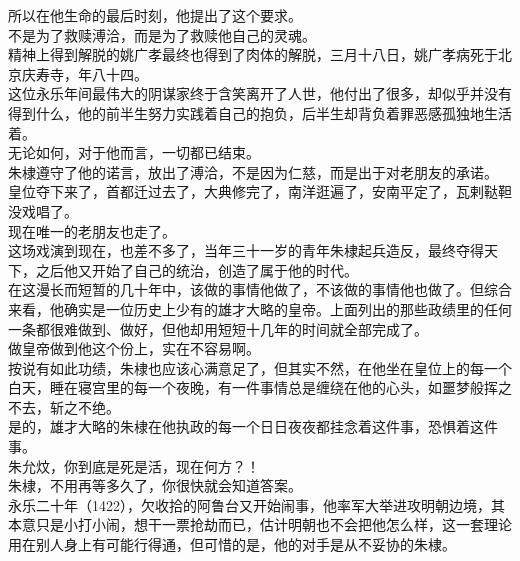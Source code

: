 \begin{multicols}{\theparacolNo}
所以在他生命的最后时刻，他提出了这个要求。\\

不是为了救赎溥洽，而是为了救赎他自己的灵魂。\\

精神上得到解脱的姚广孝最终也得到了肉体的解脱，三月十八日，姚广孝病死于北京庆寿寺，年八十四。\\

这位永乐年间最伟大的阴谋家终于含笑离开了人世，他付出了很多，却似乎并没有得到什么，他的前半生努力实践着自己的抱负，后半生却背负着罪恶感孤独地生活着。\\

无论如何，对于他而言，一切都已结束。\\

朱棣遵守了他的诺言，放出了溥洽，不是因为仁慈，而是出于对老朋友的承诺。\\

皇位夺下来了，首都迁过去了，大典修完了，南洋逛遍了，安南平定了，瓦剌鞑靼没戏唱了。\\

现在唯一的老朋友也走了。\\

这场戏演到现在，也差不多了，当年三十一岁的青年朱棣起兵造反，最终夺得天下，之后他又开始了自己的统治，创造了属于他的时代。\\

在这漫长而短暂的几十年中，该做的事情他做了，不该做的事情他也做了。但综合来看，他确实是一位历史上少有的雄才大略的皇帝。上面列出的那些政绩里的任何一条都很难做到、做好，但他却用短短十几年的时间就全部完成了。\\

做皇帝做到他这个份上，实在不容易啊。\\

按说有如此功绩，朱棣也应该心满意足了，但其实不然，在他坐在皇位上的每一个白天，睡在寝宫里的每一个夜晚，有一件事情总是缠绕在他的心头，如噩梦般挥之不去，斩之不绝。\\

是的，雄才大略的朱棣在他执政的每一个日日夜夜都挂念着这件事，恐惧着这件事。\\

朱允炆，你到底是死是活，现在何方？！\\

朱棣，不用再等多久了，你很快就会知道答案。\\

永乐二十年（1422），欠收拾的阿鲁台又开始闹事，他率军大举进攻明朝边境，其本意只是小打小闹，想干一票抢劫而已，估计明朝也不会把他怎么样，这一套理论用在别人身上有可能行得通，但可惜的是，他的对手是从不妥协的朱棣。\\


\end{multicols}
